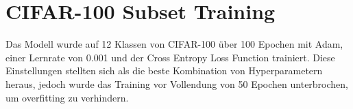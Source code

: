 \section{CIFAR-100 Subset Training}\label{section:cifar-experimente}
Das Modell wurde auf 12 Klassen von CIFAR-100 über 100 Epochen mit Adam, einer Lernrate von 0.001 und der Cross Entropy Loss Function
trainiert. Diese Einstellungen stellten sich als die beste Kombination von Hyperparametern heraus, jedoch wurde das Training vor Vollendung
von 50 Epochen unterbrochen, um \gls{overfitting} zu verhindern.

